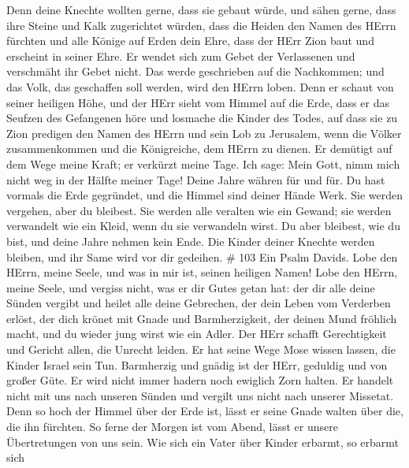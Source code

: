  Denn deine Knechte wollten gerne, dass sie gebaut würde,
und sähen gerne, dass ihre Steine und Kalk zugerichtet würden,
 dass die Heiden den Namen des HErrn fürchten und alle
Könige auf Erden dein Ehre,  dass der HErr Zion baut und
erscheint in seiner Ehre.  Er wendet sich zum Gebet der
Verlassenen und verschmäht ihr Gebet nicht.  Das werde
geschrieben auf die Nachkommen; und das Volk, das geschaffen soll
werden, wird den HErrn loben.  Denn er schaut von seiner
heiligen Höhe, und der HErr sieht vom Himmel auf die Erde, 
dass er das Seufzen des Gefangenen höre und losmache die Kinder des
Todes,  auf dass sie zu Zion predigen den Namen des HErrn
und sein Lob zu Jerusalem,  wenn die Völker zusammenkommen
und die Königreiche, dem HErrn zu dienen.  Er demütigt auf
dem Wege meine Kraft; er verkürzt meine Tage.  Ich sage:
Mein Gott, nimm mich nicht weg in der Hälfte meiner Tage! Deine Jahre
währen für und für.  Du hast vormals die Erde gegründet,
und die Himmel sind deiner Hände Werk.  Sie werden
vergehen, aber du bleibest. Sie werden alle veralten wie ein Gewand; sie
werden verwandelt wie ein Kleid, wenn du sie verwandeln wirst.
 Du aber bleibest, wie du bist, und deine Jahre nehmen kein
Ende.  Die Kinder deiner Knechte werden bleiben, und ihr
Same wird vor dir gedeihen. \# 103  Ein Psalm Davids. Lobe
den HErrn, meine Seele, und was in mir ist, seinen heiligen Namen!
 Lobe den HErrn, meine Seele, und vergiss nicht, was er dir
Gutes getan hat:  der dir alle deine Sünden vergibt und
heilet alle deine Gebrechen,  der dein Leben vom Verderben
erlöst, der dich krönet mit Gnade und Barmherzigkeit,  der
deinen Mund fröhlich macht, und du wieder jung wirst wie ein Adler.
 Der HErr schafft Gerechtigkeit und Gericht allen, die
Unrecht leiden.  Er hat seine Wege Mose wissen lassen, die
Kinder Israel sein Tun.  Barmherzig und gnädig ist der HErr,
geduldig und von großer Güte.  Er wird nicht immer hadern
noch ewiglich Zorn halten.  Er handelt nicht mit uns nach
unseren Sünden und vergilt uns nicht nach unserer Missetat.
 Denn so hoch der Himmel über der Erde ist, lässt er seine
Gnade walten über die, die ihn fürchten.  So ferne der
Morgen ist vom Abend, lässt er unsere Übertretungen von uns sein.
 Wie sich ein Vater über Kinder erbarmt, so erbarmt sich
